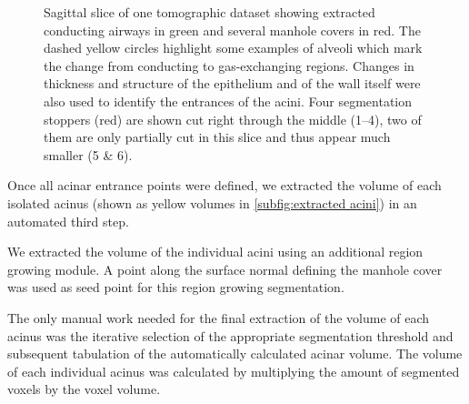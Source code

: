 \documentclass[paper=a4,DIV=calc,abstract,english]{scrartcl}
\newlength\imagescale		%
\begin{document}
\begin{figure}[htb]
%
	\caption{Sagittal slice of one tomographic dataset showing extracted conducting airways in green and several manhole covers in red.
		The dashed yellow circles highlight some examples of alveoli which mark the change from conducting to gas-exchanging regions.
		Changes in thickness and structure of the epithelium and of the wall itself were also used to identify the entrances of the acini.
		Four segmentation stoppers (red) are shown cut right through the middle (\numrange{1}{4}), two of them are only partially cut in this slice and thus appear much smaller (5 \& 6).}
	\label{fig:ManholeCoverExplanation}
\end{figure}

Once all acinar entrance points were defined, we extracted the volume of each isolated acinus (shown as yellow volumes in \autoref{subfig:extracted acini}) in an automated third step.
%

We extracted the volume of the individual acini using an additional region growing module.
A point along the surface normal defining the manhole cover was used as seed point for this region growing segmentation.

The only manual work needed for the final extraction of the volume of each acinus was the iterative selection of the appropriate segmentation threshold and subsequent tabulation of the automatically calculated acinar volume. The volume of each individual acinus was calculated by multiplying the amount of segmented voxels by the voxel volume.
\end{document}
